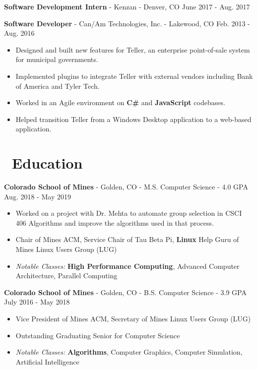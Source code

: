 \documentclass[10pt,letterpaper]{article}
\begin{document}
\vspace{2pt}
\textbf{Software Development Intern} - Kenzan - Denver, CO
\hfill June 2017 - Aug. 2017

\vspace{2pt}
\textbf{Software Developer} - Can/Am Technologies, Inc. - Lakewood, CO
\hfill Feb. 2013 - Aug. 2016
\begin{itemize}
    \item Designed and built new features for Teller, an enterprise
        point-of-sale system for municipal governments.
    \item Implemented plugins to integrate Teller with external vendors
        including Bank of America and Tyler Tech.
    \item Worked in an Agile environment on \textbf{C\#} and \textbf{JavaScript}
        codebases.
    \item Helped transition Teller from a Windows Desktop application to a
        web-based application.
\end{itemize}

\section*{\faBook\ Education}
\textbf{Colorado School of Mines} - Golden, CO - M.S. Computer Science - 4.0 GPA
\hfill Aug. 2018 - May 2019
\begin{itemize}
    \item Worked on a project with Dr. Mehta to automate group selection in
        CSCI 406 Algorithms and improve the algorithms used in that process.
    \item Chair of Mines ACM, Service Chair of Tau Beta Pi, \textbf{Linux} Help
        Guru of Mines Linux Users Group (LUG)
    \item \textit{Notable Classes:} \textbf{High Performance Computing},
        Advanced Computer Architecture, Parallel Computing
\end{itemize}

\textbf{Colorado School of Mines} - Golden, CO - B.S. Computer Science - 3.9 GPA
\hfill July 2016 - May 2018
\begin{itemize}
    \item Vice President of Mines ACM, Secretary of Mines Linux Users Group
        (LUG)
    \item Outstanding Graduating Senior for Computer Science
    \item \textit{Notable Classes:} \textbf{Algorithms}, Computer Graphics,
        Computer Simulation, Artificial Intelligence
\end{itemize}
\end{document}
